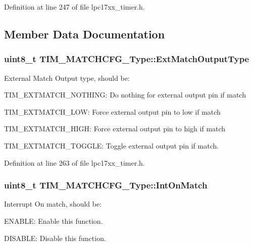 \-Definition at line 247 of file lpc17xx\-\_\-timer.\-h.



\subsection{\-Member \-Data \-Documentation}
\hypertarget{struct_t_i_m___m_a_t_c_h_c_f_g___type_a24884008a29410f4a5e6bd761ce21458}{
\subsubsection[{\-Ext\-Match\-Output\-Type}]{\setlength{\rightskip}{0pt plus 5cm}uint8\-\_\-t {\bf \-T\-I\-M\-\_\-\-M\-A\-T\-C\-H\-C\-F\-G\-\_\-\-Type\-::\-Ext\-Match\-Output\-Type}}}\label{struct_t_i_m___m_a_t_c_h_c_f_g___type_a24884008a29410f4a5e6bd761ce21458}
\-External \-Match \-Output type, should be\-:
\begin{DoxyItemize}
\item \-T\-I\-M\-\_\-\-E\-X\-T\-M\-A\-T\-C\-H\-\_\-\-N\-O\-T\-H\-I\-N\-G\-: \-Do nothing for external output pin if match
\item \-T\-I\-M\-\_\-\-E\-X\-T\-M\-A\-T\-C\-H\-\_\-\-L\-O\-W\-: \-Force external output pin to low if match
\item \-T\-I\-M\-\_\-\-E\-X\-T\-M\-A\-T\-C\-H\-\_\-\-H\-I\-G\-H\-: \-Force external output pin to high if match
\item \-T\-I\-M\-\_\-\-E\-X\-T\-M\-A\-T\-C\-H\-\_\-\-T\-O\-G\-G\-L\-E\-: \-Toggle external output pin if match. 
\end{DoxyItemize}

\-Definition at line 263 of file lpc17xx\-\_\-timer.\-h.

\hypertarget{struct_t_i_m___m_a_t_c_h_c_f_g___type_ab07a725d2072b5b92632939e23b190f9}{
\subsubsection[{\-Int\-On\-Match}]{\setlength{\rightskip}{0pt plus 5cm}uint8\-\_\-t {\bf \-T\-I\-M\-\_\-\-M\-A\-T\-C\-H\-C\-F\-G\-\_\-\-Type\-::\-Int\-On\-Match}}}\label{struct_t_i_m___m_a_t_c_h_c_f_g___type_ab07a725d2072b5b92632939e23b190f9}
\-Interrupt \-On match, should be\-:
\begin{DoxyItemize}
\item \-E\-N\-A\-B\-L\-E\-: \-Enable this function.
\item \-D\-I\-S\-A\-B\-L\-E\-: \-Disable this function. 
\end{DoxyItemize}

